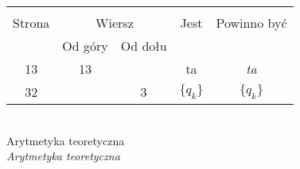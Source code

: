 \documentclass[a4paper,11pt]{article}
\begin{document}
\begin{center}
  \begin{tabular}{|c|c|c|c|c|}
    \hline
    & \multicolumn{2}{c|}{} & & \\
    Strona & \multicolumn{2}{c|}{Wiersz} & Jest
                              & Powinno być \\ \cline{2-3}
    & Od góry & Od dołu & & \\
    \hline
    13  & 13 & & ta & \emph{ta} \\
    32  & &  3 & $\boldsymbol{ \{ } q_{ k } \}$ & $\{ q_{ k } \}$ \\
    \hline
  \end{tabular}
\end{center}
\noi
{} \\
\Jest Arytmetyka teoretyczna \\
\Pow  \emph{Arytmetyka teoretyczna} \\

\vspace{\spaceTwo}





 {}




\end{document}

